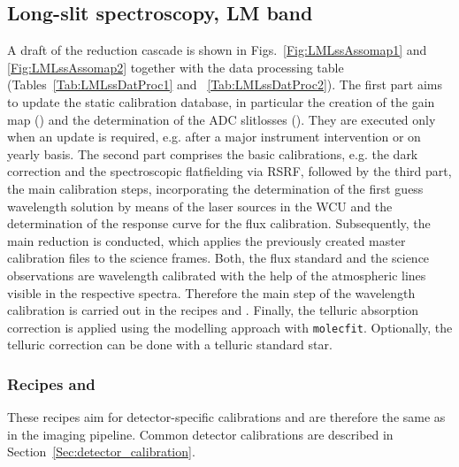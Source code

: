 \clearpage
\subsection{Long-slit spectroscopy, LM band}
\label{ssec:recipes_lss_lm}

A draft of the reduction cascade is shown in
Figs.~\ref{Fig:LMLssAssomap1} and \ref{Fig:LMLssAssomap2} together with the data processing table
(Tables~\ref{Tab:LMLssDatProc1} and ~\ref{Tab:LMLssDatProc2}). The first part aims to update the static calibration database, in particular the creation of the gain map (\hyperref[Sec:detector_calibration]{}) and the determination of the \ac{ADC} slitlosses (\hyperref[rec:metis_lm_adc_slitloss]{}). They are executed only when an update is required, e.g. after a major instrument intervention or on yearly basis. The second part comprises the basic calibrations, e.g. the dark correction and the spectroscopic flatfielding via \ac{RSRF}, followed by the third part, the main calibration steps, incorporating the determination of the first guess wavelength solution by means of the laser sources in the \ac{WCU} and the determination of the response curve for the flux calibration. Subsequently, the main reduction is conducted, which applies the previously created master calibration files to the science frames. Both, the flux standard and the science observations are wavelength calibrated with the help of the atmospheric lines visible in the respective spectra. Therefore the main step of the wavelength calibration is carried out in the recipes \hyperref[rec:metis_lm_lss_std]{} and \hyperref[rec:metis_lm_lss_sci]{}. Finally, the telluric absorption correction is applied using the modelling approach with \texttt{molecfit}. Optionally, the telluric correction can be done with a telluric standard star.

\subsubsection{Recipes  and }
These recipes aim for detector-specific calibrations and are therefore the same as in the imaging pipeline. Common detector calibrations are described in Section~\ref{Sec:detector_calibration}.

